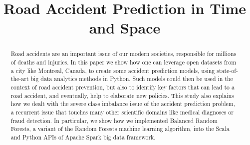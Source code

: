 \documentclass[conference]{IEEEtran}
\begin{document}
\title{Road Accident Prediction in Time and Space}

\author{
\and
{}
\and
{}
\and
{}
}

\maketitle

\begin{abstract}
Road accidents are an important issue of our modern societies, responsible for millions of deaths and injuries. In this paper we show how one can leverage open datasets from a city like Montreal, Canada, to create some accident prediction models, using state-of-the-art big data analytics methods in Python. Such models could then be used in the context of road accident prevention, but also to identify key factors that can lead to a road accident, and eventually, help to elaborate new policies. This study also explains how we dealt with the severe class imbalance issue of the accident prediction problem, a recurrent issue that touches many other scientific domains like medical diagnoses or fraud detection. In particular, we show how we implemented Balanced Random Forests, a variant of the Random Forests machine learning algorithm, into the Scala and Python APIs of Apache Spark big data framework.

\end{abstract}
\end{document}
